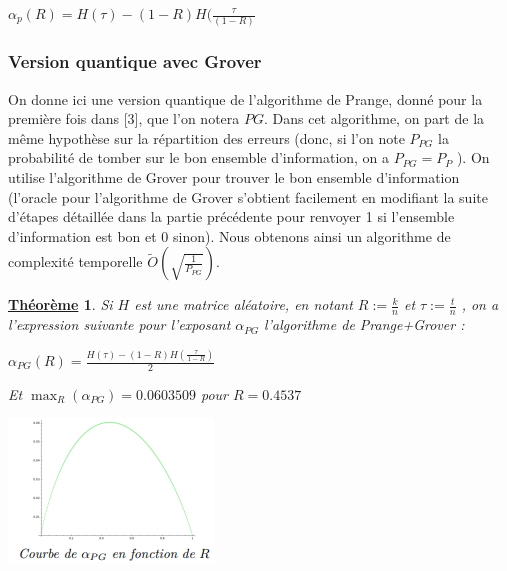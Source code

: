 \documentclass[12pt,openany]{report}
\newtheorem{theorem}{\underline{Théorème}}
\begin{document}
\begin{center}
\begin{boxedminipage}[ poslb ]{8cm}
{\Large
    $ \alpha_{p}(\mathit{R})=\mathit{H}(\tau)-(1-\mathit{R})\mathit{H}(\frac{\tau}{(1-\mathit{R})}$
    }
\end{boxedminipage}
\end{center}
\subsubsection{Version quantique avec Grover}
On donne ici une version quantique de l’algorithme de Prange, donné pour la première fois dans [3], que l’on notera $\mathit{PG}$.
Dans cet algorithme, on part de la même hypothèse sur la répartition des erreurs (donc, si l’on note $\mathit{P}_{PG}$ la probabilité de tomber sur le bon ensemble d’information, on a $\mathit{P}_{PG} = \mathit{P}_{P}$ ). On utilise l’algorithme de Grover pour trouver le bon ensemble d’information (l’oracle pour l’algorithme de Grover s’obtient facilement en modifiant la suite d’étapes détaillée dans la partie précédente pour renvoyer 1 si l’ensemble d’information est bon et 0 sinon). Nous obtenons ainsi un algorithme de complexité temporelle $\tilde{O}\left( \sqrt{\frac{1}{\mathit{P}_{PG}}} \right)   $.\cite{Ghazal}
\begin{theorem} Si $\mathit{H}$ est une matrice aléatoire, en notant $\mathit{R} := \frac{k}{n}$ et $\tau := \frac{t}{n} $
, on a l’expression suivante pour l’exposant $\alpha_{PG}$ l’algorithme de Prange+Grover :
\begin{center}
\begin{boxedminipage}[ poslb ]{7cm}
{\Large
    $ \alpha_{PG}(\mathit{R})=\frac{\mathit{H}(\tau)-(1-\mathit{R})\mathit{H}(\frac{\tau}{1-\mathit{R}})}{2}$
    }
\end{boxedminipage}
\end{center}
Et $\max_{R}(\alpha_{PG})=0.0603509$ pour $ \mathit{R}= 0.4537$
\end{theorem}

\begin{center}
\includegraphics[scale=1.8]{./prange_grover}
\end{center}
\end{document}
